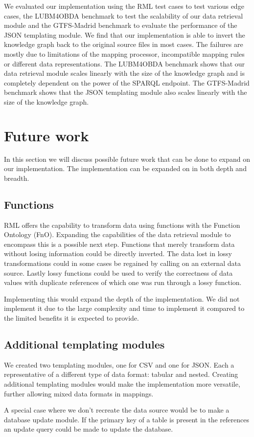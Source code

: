 We evaluated our implementation using the RML test cases to test various edge cases, the LUBM4OBDA benchmark to test the scalability of our data retrieval module and the GTFS-Madrid benchmark to evaluate the performance of the JSON templating module. We find that our implementation is able to invert the knowledge graph back to the original source files in most cases. The failures are mostly due to limitations of the mapping processor, incompatible mapping rules or different data representations. The LUBM4OBDA benchmark shows that our data retrieval module scales linearly with the size of the knowledge graph and is completely dependent on the power of the SPARQL endpoint. The GTFS-Madrid benchmark shows that the JSON templating module also scales linearly with the size of the knowledge graph.

\section{Future work}
In this section we will discuss possible future work that can be done to expand on our implementation. The implementation can be expanded on in both depth and breadth. 

\subsection{Functions}
RML offers the capability to transform data using functions with the Function Ontology (FnO). Expanding the capabilities of the data retrieval module to encompass this is a possible next step. Functions that merely transform data without losing information could be directly inverted. The data lost in lossy transformations could in some cases be regained by calling on an external data source. Lastly lossy functions could be used to verify the correctness of data values with duplicate references of which one was run through a lossy function.

Implementing this would expand the depth of the implementation. We did not implement it due to the large complexity and time to implement it compared to the limited benefits it is expected to provide.

\subsection{Additional templating modules}
We created two templating modules, one for CSV and one for JSON. Each a representative of a different type of data format: tabular and nested. Creating additional templating modules would make the implementation more versatile, further allowing mixed data formats in mappings. 

A special case where we don't recreate the data source would be to make a database update module. If the primary key of a table is present in the references an update query could be made to update the database. 